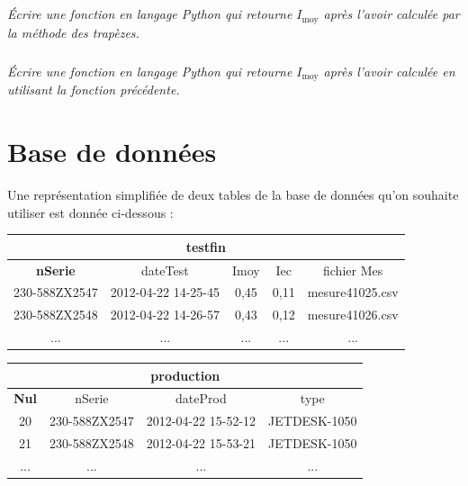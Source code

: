 \documentclass[10pt]{article}
\newif\ifprof
\begin{document}
\subparagraph{}
\textit{Écrire une fonction en langage Python qui retourne $I_{\text{moy}}$ après l'avoir calculée par la méthode des trapèzes.}
\ifprof
\begin{corrige}
\begin{python}
def calcul_moyenne(mesures,h):
    tfinal = h*len(mesures)-1
    somme = 0.5*(mesures[0]+mesures[len(mesures)-1]
    for i in range(1,len(mesures)-1):
        somme = somme + mesures[i]
    somme = (somme*h)/tfinal
    return somme
\end{python}
\end{corrige}
\else
\fi




\subparagraph{}
\textit{Écrire une fonction en langage Python qui retourne $I_{\text{moy}}$ après l'avoir calculée en utilisant la fonction précédente.}
\ifprof
\begin{corrige}
\begin{python}
def calcul_ec_type(mesures,h):
    Imoy = calcul_moyenne(mesures,h)
    # On reconstruit une liste contenant (I(t)-Imoy)**2
    for i in range(mesures):
        mesures[i] = (mesures[i]-Imoy)**2
    Iec = math.sqrt(calcul_moyenne(mesures,h))
\end{python}
\end{corrige}

\else
\fi


\section{Base de données}
Une représentation simplifiée de deux tables de la base de données qu'on souhaite utiliser
est donnée ci-dessous :

\begin{center}
\begin{tabular}{|c|c|c|c|c|}
\hline
\multicolumn{5}{|c|}{\textbf{testfin}} \\
\hline\hline
\textbf{nSerie} & dateTest & Imoy & Iec & fichier Mes \\
\hline
230-588ZX2547 & 2012-04-22 14-25-45 & 0,45 & 0,11 & mesure41025.csv \\
230-588ZX2548 & 2012-04-22 14-26-57 & 0,43 & 0,12 & mesure41026.csv \\ 
...  & ...  & ...  & ...  & ...   \\
\hline
\end{tabular}
\end{center}


\begin{center}
\begin{tabular}{|c|c|c|c|}
\hline
\multicolumn{4}{|c|}{\textbf{production}} \\
\hline\hline
\textbf{Nul} & nSerie & dateProd & type \\
\hline
20 & 230-588ZX2547 & 2012-04-22 15-52-12 & JETDESK-1050 \\
21 & 230-588ZX2548 & 2012-04-22 15-53-21 & JETDESK-1050 \\ 
...  & ...    & ...  & ...   \\
\hline
\end{tabular}
\end{center}
\end{document}
